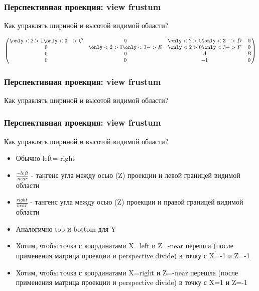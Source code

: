 \documentclass{beamer}
\begin{document}
\begin{frame}[fragile]
\frametitle{Перспективная проекция: view frustum}
Как управлять шириной и высотой видимой области?
\pause
\begin{center}
\begin{math}
\begin{pmatrix}
\only<2>{1}\only<3->{C} & 0 & \only<2>{0}\only<3->{D} & 0 \\
0 & \only<2>{1}\only<3->{E} & \only<2>{0}\only<3->{F} & 0 \\
0 & 0 & A & B \\
0 & 0 & -1 & 0
\end{pmatrix}
\end{math}
\end{center}
\end{frame}

\begin{frame}[fragile]
\frametitle{Перспективная проекция: view frustum}
Как управлять шириной и высотой видимой области?
\end{frame}

\begin{frame}[fragile]
\frametitle{Перспективная проекция: view frustum}
Как управлять шириной и высотой видимой области?
\begin{itemize}
\item Обычно left=-right
\pause
\item \begin{math}\frac{-left}{near}\end{math} - тангенс угла между осью (Z) проекции и левой границей видимой области
\item \begin{math}\frac{right}{near}\end{math} - тангенс угла между осью (Z) проекции и правой границей видимой области
\pause
\item Аналогично top и bottom для Y
\pause
\item Хотим, чтобы точка с координатами X=left и Z=-near перешла (после применения матрица проекции и perspective divide) в точку с X=-1 и Z=-1
\item Хотим, чтобы точка с координатами X=right и Z=-near перешла (после применения матрица проекции и perspective divide) в точку с X=1 и Z=-1
\end{itemize}
\end{frame}
\end{document}
